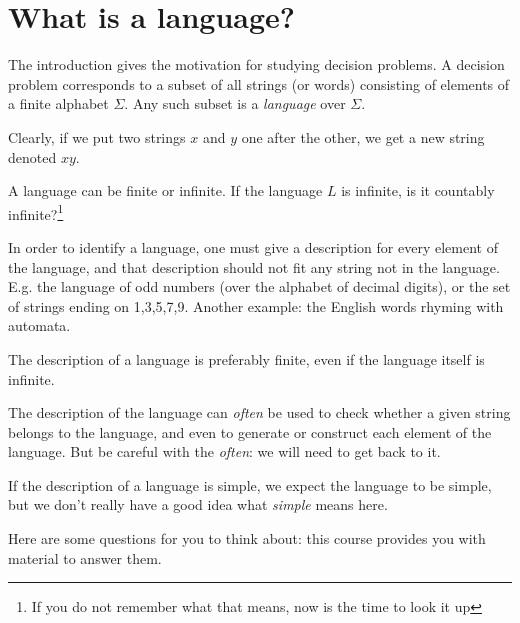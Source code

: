 \newpage
\section{What is a language?}

The introduction gives the motivation for studying decision
problems. A decision problem corresponds to a subset of all strings
(or words) consisting of elements of a finite alphabet $\Sigma$. Any
such subset is a {\em language} over $\Sigma$.


Clearly, if we put two strings $x$ and $y$ one after the other, we get
a new string denoted $xy$.



A language can be finite or infinite. If the language $L$ is infinite,
is it countably infinite?\footnote{If you do not remember what that
means, now is the time to look it up}

In order to identify a language, one must give a description for every
element of the language, and that description should not fit any
string not in the language. E.g. the language of odd numbers (over the
alphabet of decimal digits), or the set of strings ending on
1,3,5,7,9. Another example: the English words rhyming with automata.

The description of a language is preferably finite, even if the
language itself is infinite.

The description of the language can {\em often} be used to check whether a
given string belongs to the language, and even to generate or
construct each element of the language. But be careful with the {\em
often}: we will need to get back to it.

If the description of a language is simple, we expect the language to
be simple, but we don't really have a good idea what {\em simple}
means here.

Here are some questions for you to think about: this course provides
you with material to answer them.


